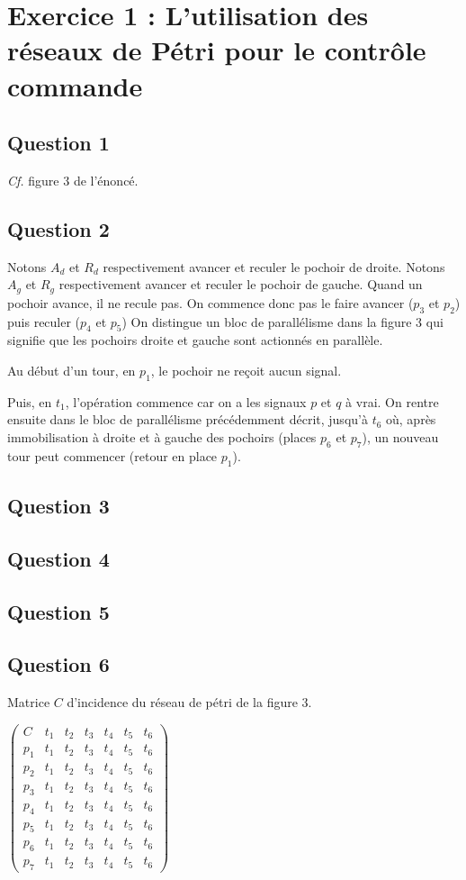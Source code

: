 \section{Exercice 1 : L'utilisation des réseaux de Pétri pour le
  contrôle commande}
\subsection{Question 1}
\textit{Cf.} figure $3$ de l'énoncé.
\subsection{Question 2}
Notons $A_d$ et $R_d$ respectivement avancer et reculer le pochoir de
droite.  Notons $A_g$ et $R_g$ respectivement avancer et reculer le
pochoir de gauche.  Quand un pochoir avance, il ne recule pas.  On
commence donc pas le faire avancer ($p_3$ et $p_2$) puis reculer
($p_4$ et $p_5$) On distingue un bloc de parallélisme dans la figure 3
qui signifie que les pochoirs droite et gauche sont actionnés en
parallèle.

Au début d'un tour, en $p_1$, le pochoir ne reçoit aucun signal.  

Puis, en $t_1$, l'opération commence car on a les signaux $p$ et $q$ à
vrai. On rentre ensuite dans le bloc de parallélisme précédemment
décrit, jusqu'à $t_6$ où, après immobilisation à droite et à gauche
des pochoirs (places $p_6$ et $p_7$), un nouveau tour peut commencer
(retour en place $p_1$).
\subsection{Question 3}

\subsection{Question 4}

\subsection{Question 5}

\subsection{Question 6}
Matrice $C$ d'incidence du réseau de pétri de la figure $3$.

 $ \begin{pmatrix}
C&t_1&t_2&t_3&t_4&t_5&t_6 \\
p_1&t_1&t_2&t_3&t_4&t_5&t_6 \\
p_2&t_1&t_2&t_3&t_4&t_5&t_6 \\
p_3&t_1&t_2&t_3&t_4&t_5&t_6 \\
p_4&t_1&t_2&t_3&t_4&t_5&t_6 \\
p_5&t_1&t_2&t_3&t_4&t_5&t_6 \\
p_6&t_1&t_2&t_3&t_4&t_5&t_6 \\
p_7&t_1&t_2&t_3&t_4&t_5&t_6 
\end{pmatrix}$

